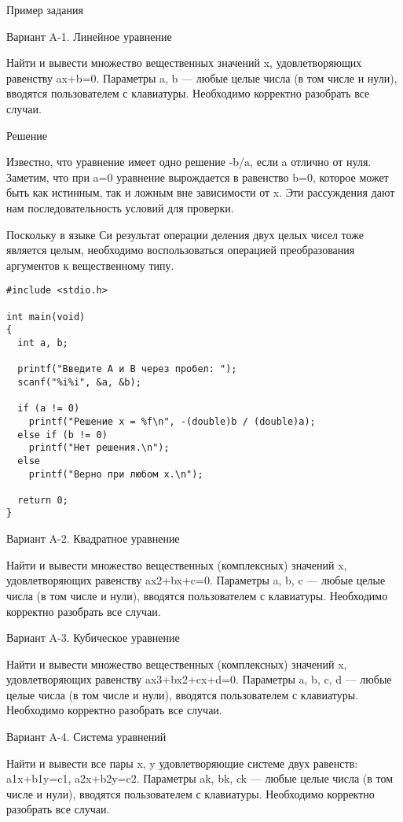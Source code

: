 Пример задания

Вариант A-1. Линейное уравнение

Найти и вывести множество вещественных значений x, удовлетворяющих равенству
ax+b=0. Параметры a, b — любые целые числа (в том числе и нули), вводятся
пользователем с клавиатуры. Необходимо корректно разобрать все случаи.

Решение

Известно, что уравнение имеет одно решение -b/a, если a отлично от нуля.
Заметим, что при a=0 уравнение вырождается в равенство b=0, которое может быть
как истинным, так и ложным вне зависимости от x. Эти рассуждения дают нам
последовательность условий для проверки.

Поскольку в языке Си результат операции деления двух целых чисел тоже является
целым, необходимо воспользоваться операцией преобразования аргументов к
вещественному типу.

\begin{verbatim}
#include <stdio.h>

int main(void)
{
  int a, b;

  printf("Введите A и B через пробел: ");
  scanf("%i%i", &a, &b);

  if (a != 0)
    printf("Решение x = %f\n", -(double)b / (double)a);
  else if (b != 0)
    printf("Нет решения.\n");
  else
    printf("Верно при любом x.\n");

  return 0;
}
\end{verbatim}


Вариант A-2. Квадратное уравнение

Найти и вывести множество вещественных (комплексных) значений x,
удовлетворяющих равенству ax2+bx+c=0. Параметры a, b, c — любые целые числа (в
том числе и нули), вводятся пользователем с клавиатуры. Необходимо корректно
разобрать все случаи.


Вариант A-3. Кубическое уравнение

Найти и вывести множество вещественных (комплексных) значений x,
удовлетворяющих равенству ax3+bx2+cx+d=0. Параметры a, b, c, d — любые целые
числа (в том числе и нули), вводятся пользователем с клавиатуры. Необходимо
корректно разобрать все случаи.


Вариант A-4. Система уравнений

Найти и вывести все пары x, y удовлетворяющие системе двух равенств:
a1x+b1y=c1, a2x+b2y=c2. Параметры ak, bk, ck — любые целые числа (в том числе
и нули), вводятся пользователем с клавиатуры. Необходимо корректно разобрать
все случаи.

